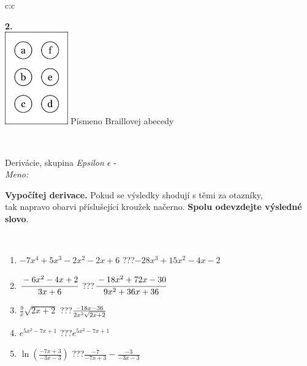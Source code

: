 \documentclass[10pt]{report}
\begin{document}
\begin{tabular}{c:c}
\begin{minipage}[c][104.5mm][t]{0.5\linewidth}
\begin{center}
\begin{minipage}{0.20\linewidth}
\begin{center}
{\Huge\bfseries 2.} \\[2mm]
\includegraphics[height=40mm]{../images/braille.png}
{\small Písmeno Braillovej abecedy}
\end{center}
\end{minipage}
\end{center}
\end{minipage}
\\ \hdashline
\begin{minipage}[c][104.5mm][t]{0.5\linewidth}
\begin{center}
\vspace{7mm}
{\huge Derivácie, skupina \textit{Epsilon $\epsilon$} -}\\[5mm]
\textit{Meno:}\phantom{xxxxxxxxxxxxxxxxxxxxxxxxxxxxxxxxxxxxxxxxxxxxxxxxxxxxxxxxxxxxxxxxx}\\[5mm]
\begin{minipage}{0.95\linewidth}
\begin{center}
\textbf{Vypočítej derivace.} Pokud se výsledky shodují s těmi za otazníky,\\tak napravo obarvi příslušející kroužek načerno. \textbf{Spolu odevzdejte výsledné slovo}.
\end{center}
\end{minipage}
\\[1mm]
\begin{minipage}{0.79\linewidth}
\begin{center}
\begin{varwidth}{\linewidth}
\begin{enumerate}
\normalsize
\item $-7x^4+5x^3-2x^2-2x+6$\quad \dotfill\; ???\;\dotfill \quad $-28x^3+15x^2-4x-2$
\item $\cfrac{-6x^2-4x+2}{3x+6}$\quad \dotfill\; ???\;\dotfill \quad $\cfrac{-18x^2+72x-30}{9x^2+36x+36}$
\item $\frac{9}{x}\sqrt{2x+2}$\quad \dotfill\; ???\;\dotfill \quad $\frac{-18x-36}{2x^2 \sqrt{\smash[b]{2x+2}}}$
\item $e^{5x^2-7x+1}$\quad \dotfill\; ???\;\dotfill \quad $e^{5x^2-7x+1}$
\item $\ln{\left(\frac{-7x+3}{-3x-3}\right)}$\quad \dotfill\; ???\;\dotfill \quad $\frac{-7}{-7x+3}-\frac{-3}{-3x-3}$

\end{enumerate}
\end{varwidth}
\end{center}
\end{minipage}
\end{center}
\end{minipage}
\end{tabular}
\end{document}
